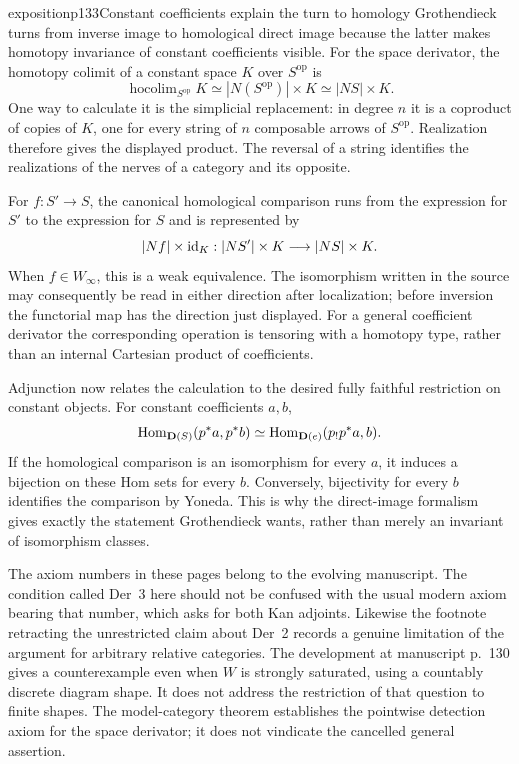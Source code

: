 \begin{dcomment}{exposition}{p133}{Constant coefficients explain the turn to homology}
Grothendieck turns from inverse image to homological direct image because the latter makes homotopy invariance of constant coefficients visible. For the space derivator, the homotopy colimit of a constant space $K$ over $S^{\mathrm{op}}$ is
\[
 \operatorname{hocolim}_{S^{\mathrm{op}}}K\simeq |N(S^{\mathrm{op}})|\times K
 \simeq |NS|\times K.
\]
One way to calculate it is the simplicial replacement: in degree $n$ it is a coproduct of copies of $K$, one for every string of $n$ composable arrows of $S^{\mathrm{op}}$. Realization therefore gives the displayed product. The reversal of a string identifies the realizations of the nerves of a category and its opposite.

For $f:S'\to S$, the canonical homological comparison runs from the expression for $S'$ to the expression for $S$ and is represented by
\[
 |Nf|\times\mathrm{id}_K:|NS'|\times K\longrightarrow|NS|\times K.
\]
When $f\in W_\infty$, this is a weak equivalence. The isomorphism written in the source may consequently be read in either direction after localization; before inversion the functorial map has the direction just displayed. For a general coefficient derivator the corresponding operation is tensoring with a homotopy type, rather than an internal Cartesian product of coefficients.

Adjunction now relates the calculation to the desired fully faithful restriction on constant objects. For constant coefficients $a,b$,
\[
 \operatorname{Hom}_{\mathbf D(S)}(p^*a,p^*b)
 \simeq\operatorname{Hom}_{\mathbf D(e)}(p_!p^*a,b).
\]
If the homological comparison is an isomorphism for every $a$, it induces a bijection on these Hom sets for every $b$. Conversely, bijectivity for every $b$ identifies the comparison by Yoneda. This is why the direct-image formalism gives exactly the statement Grothendieck wants, rather than merely an invariant of isomorphism classes.

The axiom numbers in these pages belong to the evolving manuscript. The condition called Der~3 here should not be confused with the usual modern axiom bearing that number, which asks for both Kan adjoints. Likewise the footnote retracting the unrestricted claim about Der~2 records a genuine limitation of the argument for arbitrary relative categories. The development at manuscript p.~130 gives a counterexample even when $W$ is strongly saturated, using a countably discrete diagram shape. It does not address the restriction of that question to finite shapes. The model-category theorem establishes the pointwise detection axiom for the space derivator; it does not vindicate the cancelled general assertion.
\end{dcomment}



